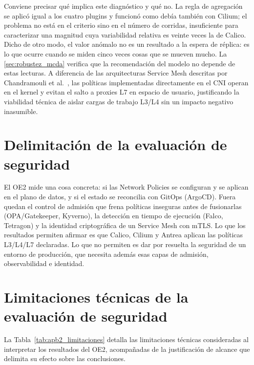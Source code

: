 Conviene precisar qué implica este diagnóstico y qué no. La regla de agregación se aplicó igual a los cuatro plugins y funcionó como debía también con Cilium; el problema no está en el criterio sino en el número de corridas, insuficiente para caracterizar una magnitud cuya variabilidad relativa es veinte veces la de Calico. Dicho de otro modo, el valor anómalo no es un resultado a la espera de réplica: es lo que ocurre cuando se miden cinco veces cosas que se mueven mucho. La \cref{sec:robustez_mcda} verifica que la recomendación del modelo no depende de estas lecturas. A diferencia de las arquitecturas Service Mesh descritas por Chandramouli et al.~\cite{ref26}, las políticas implementadas directamente en el CNI operan en el kernel y evitan el salto a proxies L7 en espacio de usuario, justificando la viabilidad técnica de aislar cargas de trabajo L3/L4 sin un impacto negativo inasumible.

\section{Delimitación de la evaluación de seguridad} \label{sec:delimitacion_oe2}
El OE2 mide una cosa concreta: si las Network Policies se configuran y se aplican en el plano de datos, y si el estado se reconcilia con GitOps (ArgoCD). Fuera quedan el control de admisión que frena políticas inseguras antes de fusionarlas (OPA/Gatekeeper, Kyverno), la detección en tiempo de ejecución (Falco, Tetragon) y la identidad criptográfica de un Service Mesh con mTLS. Lo que los resultados permiten afirmar es que Calico, Cilium y Antrea aplican las políticas L3/L4/L7 declaradas. Lo que no permiten es dar por resuelta la seguridad de un entorno de producción, que necesita además esas capas de admisión, observabilidad e identidad.

\section{Limitaciones técnicas de la evaluación de seguridad} \label{sec:apb2_limitaciones}

La Tabla~\ref{tab:apb2_limitaciones} detalla las limitaciones técnicas consideradas al interpretar los resultados del OE2, acompañadas de la justificación de alcance que delimita su efecto sobre las conclusiones.

